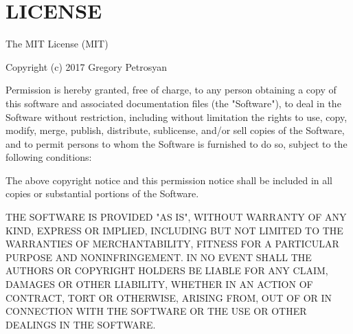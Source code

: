 \chapter{LICENSE}
\hypertarget{md_public_2_muse_2assets_2vendor_2flatpickr_2_l_i_c_e_n_s_e}{}\label{md_public_2_muse_2assets_2vendor_2flatpickr_2_l_i_c_e_n_s_e}
The MIT License (MIT)

Copyright (c) 2017 Gregory Petrosyan

Permission is hereby granted, free of charge, to any person obtaining a copy of this software and associated documentation files (the "{}\+Software"{}), to deal in the Software without restriction, including without limitation the rights to use, copy, modify, merge, publish, distribute, sublicense, and/or sell copies of the Software, and to permit persons to whom the Software is furnished to do so, subject to the following conditions\+:

The above copyright notice and this permission notice shall be included in all copies or substantial portions of the Software.

THE SOFTWARE IS PROVIDED "{}\+AS IS"{}, WITHOUT WARRANTY OF ANY KIND, EXPRESS OR IMPLIED, INCLUDING BUT NOT LIMITED TO THE WARRANTIES OF MERCHANTABILITY, FITNESS FOR A PARTICULAR PURPOSE AND NONINFRINGEMENT. IN NO EVENT SHALL THE AUTHORS OR COPYRIGHT HOLDERS BE LIABLE FOR ANY CLAIM, DAMAGES OR OTHER LIABILITY, WHETHER IN AN ACTION OF CONTRACT, TORT OR OTHERWISE, ARISING FROM, OUT OF OR IN CONNECTION WITH THE SOFTWARE OR THE USE OR OTHER DEALINGS IN THE SOFTWARE. 